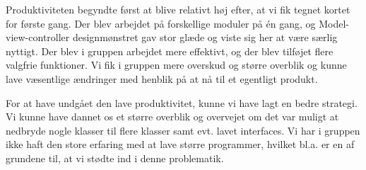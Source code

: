 Produktiviteten begyndte først at blive relativt høj efter, at vi fik tegnet kortet for første gang. Der blev arbejdet på forskellige moduler på én gang, og Model-view-controller designmønstret gav stor glæde og viste sig her at være særlig nyttigt. Der blev i gruppen arbejdet mere effektivt, og der blev tilføjet flere valgfrie funktioner. Vi fik i gruppen mere overskud og større overblik og kunne lave væsentlige ændringer med henblik på at nå til  et egentligt produkt. 

For at have undgået den lave produktivitet, kunne vi have lagt en bedre strategi. Vi kunne have dannet os et større overblik og overvejet om det var muligt at nedbryde nogle klasser til flere klasser samt evt. lavet interfaces. Vi har i gruppen ikke haft den store erfaring med at lave større programmer, hvilket bl.a. er en af grundene til, at vi stødte ind i denne problematik.
